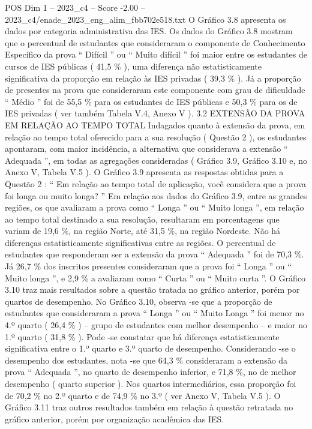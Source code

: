 \begin{textsample}{POS Dim 1 – 2023\_c4 – Score -2.00 – 2023\_c4/enade\_2023\_eng\_alim\_fbb702e518.txt}
O Gráfico 3.8 apresenta os dados por categoria administrativa das IES.
Os dados do Gráfico 3.8 mostram que o percentual de estudantes que consideraram o componente de Conhecimento Específico da prova “ Difícil ” ou “ Muito difícil ” foi maior entre os estudantes de cursos de IES públicas ( 41,5 \% ), uma diferença não estatisticamente significativa da proporção em relação às IES privadas ( 39,3 \% ).
Já a proporção de presentes na prova que consideraram este componente com grau de dificuldade “ Médio ” foi de 55,5 \% para os estudantes de IES públicas e 50,3 \% para os de IES privadas ( ver também Tabela V.4, Anexo V ). 3.2 EXTENSÃO DA PROVA EM RELAÇÃO AO TEMPO TOTAL Indagados quanto à extensão da prova, em relação ao tempo total oferecido para a sua resolução ( Questão 2 ), os estudantes apontaram, com maior incidência, a alternativa que considerava a extensão “ Adequada ”, em todas as agregações consideradas ( Gráfico 3.9, Gráfico 3.10 e, no Anexo V, Tabela V.5 ).
O Gráfico 3.9 apresenta as respostas obtidas para a Questão 2 : “ Em relação ao tempo total de aplicação, você considera que a prova foi longa ou muito longa? ” Em relação aos dados do Gráfico 3.9, entre as grandes regiões, os que avaliaram a prova como “ Longa ” ou “ Muito longa ”, em relação ao tempo total destinado a sua resolução, resultaram em porcentagens que variam de 19,6 \%, na região Norte, até 31,5 \%, na região Nordeste.
Não há diferenças estatisticamente significativas entre as regiões.
O percentual de estudantes que responderam ser a extensão da prova “ Adequada ” foi de 70,3 \%.
Já 26,7 \% dos inscritos presentes consideraram que a prova foi “ Longa ” ou “ Muito longa ”, e 2,9 \% a avaliaram como “ Curta ” ou “ Muito curta ”.
O Gráfico 3.10 traz mais resultados sobre a questão tratada no gráfico anterior, porém por quartos de desempenho.
No Gráfico 3.10, observa -se que a proporção de estudantes que consideraram a prova “ Longa ” ou “ Muito Longa ” foi menor no 4.º quarto ( 26,4 \% ) – grupo de estudantes com melhor desempenho – e maior no 1.º quarto ( 31,8 \% ).
Pode -se constatar que há diferença estatisticamente significativa entre o 1.º quarto e 3.º quarto de desempenho.
Considerando -se o desempenho dos estudantes, nota -se que 64,3 \% consideraram a extensão da prova “ Adequada ”, no quarto de desempenho inferior, e 71,8 \%, no de melhor desempenho ( quarto superior ).
Nos quartos intermediários, essa proporção foi de 70,2 \% no 2.º quarto e de 74,9 \% no 3.º ( ver Anexo V, Tabela V.5 ).
O Gráfico 3.11 traz outros resultados também em relação à questão retratada no gráfico anterior, porém por organização acadêmica das IES.

\end{textsample}
